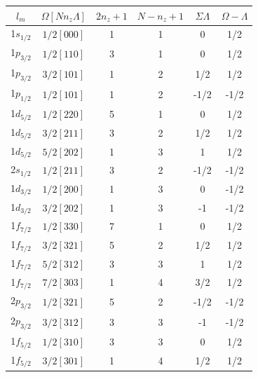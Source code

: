 \documentclass[10pt,a4paper, twoside]{report}
\begin{document}
\begin{table}[htbp]
\centering
\begin{tabular}{|c|c|c|c|c|c|}
\toprule
\toprule
$l_m$      & $\Omega[Nn_z\Lambda]$ & $2n_z + 1$ & $N - n_z + 1$ & $\Sigma\Lambda$ & $\Omega - \Lambda$ \\
\midrule
1$s_{1/2}$ & $1/2[000]$            & 1          & 1             & 0       &   1/2     \\
1$p_{3/2}$ & $1/2[110]$            & 3          & 1             & 0      &   1/2      \\
1$p_{3/2}$ & $3/2[101]$            & 1          & 2             & 1/2   &   1/2           \\
1$p_{1/2}$ & $1/2[101]$            & 1          & 2             & -1/2    &   -1/2       \\
\midrule
1$d_{5/2}$ & $1/2[220]$            & 5          & 1             & 0      & 1/2        \\
1$d_{5/2}$ & $3/2[211]$            & 3          & 2             & 1/2    & 1/2           \\
1$d_{5/2}$ & $5/2[202]$            & 1          & 3             & 1       & 1/2        \\
2$s_{1/2}$ & $1/2[211]$            & 3          & 2             & -1/2      & -1/2         \\
1$d_{3/2}$ & $1/2[200]$            & 1          & 3             & 0         & -1/2      \\
1$d_{3/2}$ & $3/2[202]$            & 1          & 3             & -1       & -1/2        \\
\midrule
1$f_{7/2}$ & $1/2[330]$            & 7          & 1             & 0        & 1/2       \\
1$f_{7/2}$ & $3/2[321]$            & 5          & 2             & 1/2      & 1/2         \\
1$f_{7/2}$ & $5/2[312]$            & 3          & 3             & 1          & 1/2     \\
1$f_{7/2}$ & $7/2[303]$            & 1          & 4             & 3/2       & 1/2        \\
2$p_{3/2}$ & $1/2[321]$            & 5          & 2             & -1/2      & -1/2         \\
2$p_{3/2}$ & $3/2[312]$            & 3          & 3             & -1       & -1/2        \\
1$f_{5/2}$ & $1/2[310]$            & 3          & 3             & 0         & 1/2      \\
1$f_{5/2}$ & $3/2[301]$            & 1          & 4             & 1/2      & 1/2         \\

\end{tabular}
\end{table}
\end{document}
